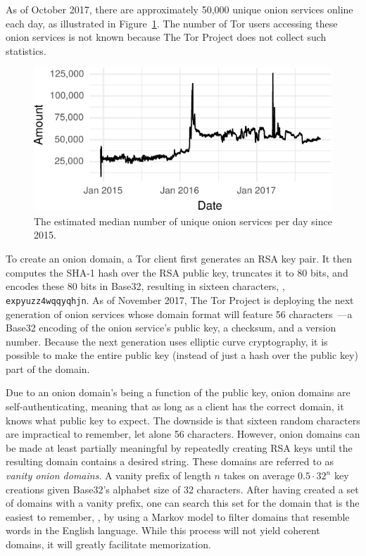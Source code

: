 As of October 2017, there are approximately 50,000 unique onion services online
each day, as illustrated in Figure~\ref{fig:os-growth}.  The number of Tor users
accessing these onion services is not known because The Tor Project does not
collect such statistics.

\begin{figure}[t]
\includegraphics[width=\linewidth]{figures/os-growth.pdf}
\caption{The estimated median number of unique onion services per day since
2015.}
\label{fig:os-growth}
\end{figure}

To create an onion domain, a Tor client first generates an RSA key pair.  It
then computes the SHA-1 hash over the RSA public key, truncates it to 80 bits,
and encodes these 80 bits in Base32, resulting in sixteen characters, \eg,
\texttt{expyuzz4wqqyqhjn}.  As of November 2017, The Tor Project is deploying
the next generation of onion services whose domain format will feature 56
characters~\cite[\S~6]{Mathewson2013a}---a Base32 encoding of the onion
service's public key, a checksum, and a version number.  Because the next
generation uses elliptic curve cryptography, it is possible to make the entire
public key (instead of just a hash over the public key) part of the domain.

Due to an onion domain's being a function of the public key, onion domains are
self-authenticating, meaning that as long as a client has the correct domain, it
knows what public key to expect.  The downside is that sixteen random characters
are impractical to remember, let alone 56 characters.  However, onion domains
can be made at least partially meaningful by repeatedly creating RSA keys until
the resulting domain contains a desired string.  These domains are referred to
as \emph{vanity onion domains}.  A vanity prefix of length $n$ takes on average
$0.5 \cdot 32^n$ key creations given Base32's alphabet size of 32 characters.
After having created a set of domains with a vanity prefix, one can search this
set for the domain that is the easiest to remember, \eg, by using a Markov model
to filter domains that resemble words in the English language.  While this
process will not yield coherent domains, it will greatly facilitate
memorization.

